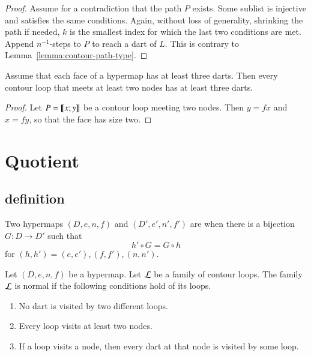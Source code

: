 
\begin{proof} Assume for a contradiction that the path $P$ exists.
Some sublist is injective and satisfies the same conditions.  Again,
without loss of generality, shrinking the path if needed, $k$ is the
smallest index for which the last two conditions are met.  Append
$n^{-1}$-steps to $P$ to reach a dart of $L$.  This is contrary to
Lemma~\ref{lemma:contour-path-type}.
\end{proof}

\begin{lemma}\label{lemma:3dart}  
Assume that each face of a hypermap  has at least three darts.
Then every contour loop that meets at least two nodes has at least
three darts.
\end{lemma}

\begin{proof} Let $P={\llbracket{x;y}\rrbracket}$ be a contour loop meeting two nodes.  Then
$y = f x$ and $x = f y$, so that the face has size two.
\end{proof}


\section{Quotient}
%

\subsection{definition}

\begin{definition}[isomorphism] Two hypermaps $(D,e,n,f)$ and
$(D',e',n',f')$ are  when there is a bijection
$G:D\to D'$ such that
\begin{displaymath}h'\circ G = G\circ h\end{displaymath}
for $(h,h')=(e,e'), (f,f'), (n,n')$.
%
%
\end{definition}


\begin{definition}
Let $(D,e,n,f)$ be a hypermap. 
Let $\cal L$ be a family of contour
loops.  The family $\cal L$ is  normal if the following
conditions hold of its loops. \begin{enumerate}
\item  No dart is visited by two different loops.
\item  Every loop visits at least two nodes.
\item  If a loop visits a node, then every dart at that node is visited
by some loop.
\end{enumerate}
%
\end{definition}

